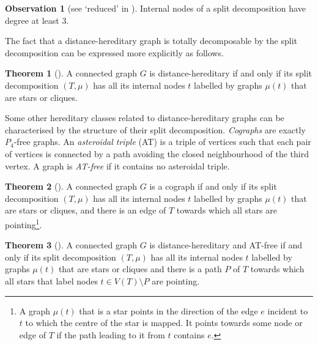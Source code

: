 \documentclass{amsart}
\theoremstyle{definition}
\newtheorem{theorem}{Theorem}
\newtheorem{observation}{Observation}
\begin{document}
\begin{observation}[see `reduced' in \cite{GioanP12}]
	Internal nodes of a split decomposition have degree at least $3$.
\end{observation}

The fact that a distance-hereditary graph is totally decomposable by the split
decomposition can be expressed more explicitly as follows.

\begin{theorem}[\cite{GioanP12}]\label{thm:totally-decomposable}
	A connected graph $G$ is distance-hereditary if and only if its split decomposition
	$(T,\mu)$ has all its internal nodes $t$ labelled by graphs $\mu(t)$ that are stars or
	cliques.
\end{theorem}

Some other hereditary classes related to distance-hereditary graphs can be
characterised by the structure of their split decomposition.
\emph{Cographs} are exactly $P_4$-free graphs.
An \emph{asteroidal triple} (AT) is a triple of vertices such that each pair of
vertices is connected by a path avoiding the closed neighbourhood of the third
vertex. A graph is \emph{AT-free} if it contains no asteroidal triple.

\begin{theorem}[\cite{GioanP12}]\label{thm:dec-cograph}
	A connected graph $G$ is a cograph if and only if its split decomposition $(T,\mu)$
	has all its internal nodes $t$ labelled by graphs $\mu(t)$ that are stars
	or cliques, and there is an edge of $T$ towards which all stars are
	pointing\footnote{A graph $\mu(t)$ that is a star points in the direction
	of the edge $e$ incident to $t$ to which the centre of the star is mapped.
	It points towards some node or edge of $T$ if the path leading to it from
	$t$ contains $e$.}.
\end{theorem}

\begin{theorem}[\cite{twwOne}]
	A connected graph $G$ is distance-hereditary and AT-free
	if and only if its split decomposition $(T,\mu)$ has all its internal nodes
	$t$ labelled by graphs $\mu(t)$ that are stars or cliques and there is a
	path $P$ of $T$ towards which all stars that label nodes $t \in V(T)\setminus
	P$ are pointing.
\end{theorem}
\end{document}
